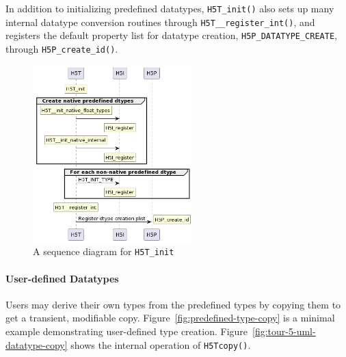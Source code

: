 In addition to initializing predefined datatypes, \texttt{H5T\_init()} also sets up many internal datatype conversion routines through \texttt{H5T\_\_register\_int()}, and registers the default property list for datatype creation, \texttt{H5P\_DATATYPE\_CREATE}, through \texttt{H5P\_create\_id()}.

\begin{figure}
\centering
\includegraphics[width=0.55\textwidth]{images/tour_5_uml_h5t_init.png}
\caption{A sequence diagram for \texttt{H5T\_init}}
\label{fig:h5t-init-table}
\end{figure}

\paragraph{User-defined Datatypes} Users may derive their own types from the predefined types by copying them to get a transient, modifiable copy. Figure~\ref{fig:predefined-type-copy} is a minimal example demonstrating user-defined type creation. Figure~\ref{fig:tour-5-uml-datatype-copy} shows the internal operation of \texttt{H5Tcopy()}.

